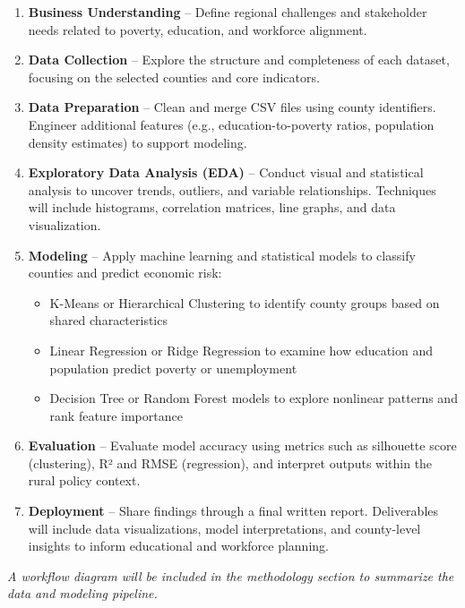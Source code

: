 \documentclass[12pt]{llncs}
\begin{document}
\begin{enumerate}
    \item \textbf{Business Understanding} – Define regional challenges and stakeholder needs related to poverty, education, and workforce alignment.
    \item \textbf{Data Collection} – Explore the structure and completeness of each dataset, focusing on the selected counties and core indicators. 
    \item \textbf{Data Preparation} – Clean and merge CSV files using county identifiers. Engineer additional features (e.g., education-to-poverty ratios, population density estimates) to support modeling.
    \item \textbf{Exploratory Data Analysis (EDA)} – Conduct visual and statistical analysis to uncover trends, outliers, and variable relationships. Techniques will include histograms, correlation matrices, line graphs, and data visualization.
    \item \textbf{Modeling} – Apply machine learning and statistical models to classify counties and predict economic risk:
    \begin{itemize}
        \item K-Means or Hierarchical Clustering to identify county groups based on shared characteristics
        \item Linear Regression or Ridge Regression to examine how education and population predict poverty or unemployment
        \item Decision Tree or Random Forest models to explore nonlinear patterns and rank feature importance
    \end{itemize}
    \item \textbf{Evaluation} – Evaluate model accuracy using metrics such as silhouette score (clustering), R² and RMSE (regression), and interpret outputs within the rural policy context.
    \item \textbf{Deployment} – Share findings through a final written report. Deliverables will include data visualizations, model interpretations, and county-level insights to inform educational and workforce planning.
\end{enumerate}

\textit{A workflow diagram will be included in the methodology section to summarize the data and modeling pipeline.}
\end{document}

